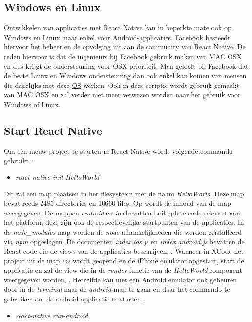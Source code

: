 \subsection{Windows en Linux}
Ontwikkelen van applicaties met React Native kan in beperkte mate ook op Windows en Linux maar enkel voor Android-applicaties. Facebook besteedt hiervoor het beheer en de opvolging uit aan de community van React Native. De reden hiervoor is dat de ingenieurs bij Facebook gebruik maken van MAC OSX en dus krijgt de ondersteuning voor OSX prioriteit. Men gelooft bij Facebook dat de beste Linux en Windows ondersteuning dan ook enkel kan komen van mensen die dagelijks met deze \hyperref[os]{OS} werken. \citep{facebook:ReactNative}
Ook in deze scriptie wordt gebruik gemaakt van MAC OSX en zal verder niet meer verwezen worden naar het gebruik voor Windows of Linux.
\subsection{Start React Native}
Om een nieuw project te starten in React Native wordt volgende commando gebruikt : 
\begin{itemize}
	\item [] \emph{react-native init HelloWorld}
\end{itemize}
Dit zal een map plaatsen in het filesysteem met de naam \emph{HelloWorld}. Deze map bevat reeds 2485 directories en 10660 files. Op  wordt de inhoud van de map weergegeven. De mappen \emph{android} en \emph{ios} bevatten \hyperref[boilerplate]{boilerplate code} relevant aan het platform, deze zijn ook de respectievelijke startpunten van de applicaties. In de \emph{node\_modules} map worden de \emph{node} afhankelijkheden die werden geïstalleerd via \emph{npm} opgeslagen. De documenten \emph{index.ios.js} en \emph{index.android.js} bevatten de React code die de views van de applicaties beschrijven, . Wanneer in XCode het project uit de map \emph{ios} wordt geopend en de iPhone emulator opgestart, start de applicatie en zal de view die in de \emph{render} functie van de \emph{HelloWorld} component weergegeven worden, . Hetzelfde kan met een Android emulator ook gebeuren door in de \emph{terminal} naar de \emph{android} map te gaan en daar het commando te gebruiken om de android applicatie te starten : 
\begin{itemize}
	\item [] \emph{react-native run-android}
\end{itemize}

